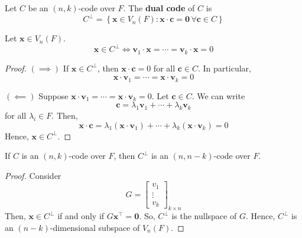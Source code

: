 \begin{defbox}
    \begin{definition}
        Let $ C $ be an $ (n,k) $-code over $ F $. The \textbf{dual code}
        of $ C $ is
        \[ C^{\perp}=\left\{ \bm{x}\in V_n(F):\bm{x}\cdot \bm{c}=\bm{0}\,\forall \bm{c}\in C\right\} \]
    \end{definition} \end{defbox}

\begin{thmbox}
    \begin{theorem}
        Let $ \bm{x}\in V_n(F) $.
        \[ \bm{x}\in C^{\perp}\iff \bm{v}_1\cdot \bm{x}=\cdots =\bm{v}_k\cdot \bm{x}=0 \]
    \end{theorem} \end{thmbox}

\begin{proof}
    $ (\implies) $ If $ \bm{x}\in C^{\perp} $, then $ \bm{x}\cdot \bm{c}=0 $ for all
    $ \bm{c}\in C $. In particular,
    \[ \bm{x}\cdot \bm{v}_1=\cdots =\bm{x}\cdot \bm{v}_k=0 \]

    $ (\impliedby) $ Suppose $ \bm{x}\cdot \bm{v}_1=\cdots =\bm{x}\cdot \bm{v}_k=0 $. Let $ \bm{c}\in C $.
    We can write
    \[ \bm{c}=\lambda_1\bm{v}_1+\cdots+\lambda_k\bm{v}_k \]
    for all $ \lambda_i\in F $. Then,
    \[ \bm{x}\cdot \bm{c}=\lambda_1(\bm{x}\cdot \bm{v}_1)+\cdots+\lambda_k(\bm{x}\cdot \bm{v}_k)=0 \]
    Hence, $ \bm{x}\in C^{\perp} $.
\end{proof}

\begin{thmbox}
    \begin{theorem}
        If $ C $ is an $ (n,k) $-code over $ F $, then $ C^{\perp} $ is an
        $ (n,n-k) $-code over $ F $.
    \end{theorem} \end{thmbox}

\begin{proof}
    Consider
    \[ G=\begin{bmatrix}
            v_1    \\
            \vdots \\
            v_k
        \end{bmatrix}_{k\times n} \]
    Then, $ \bm{x}\in C^{\perp} $ if and only if $ G \bm{x}^{\top}=\bm{0} $. So, $ C^{\perp} $
    is the nullspace of $ G $. Hence, $ C^{\perp} $ is an
    $ (n-k) $-dimensional subspace of $ V_n(F) $.
\end{proof}

